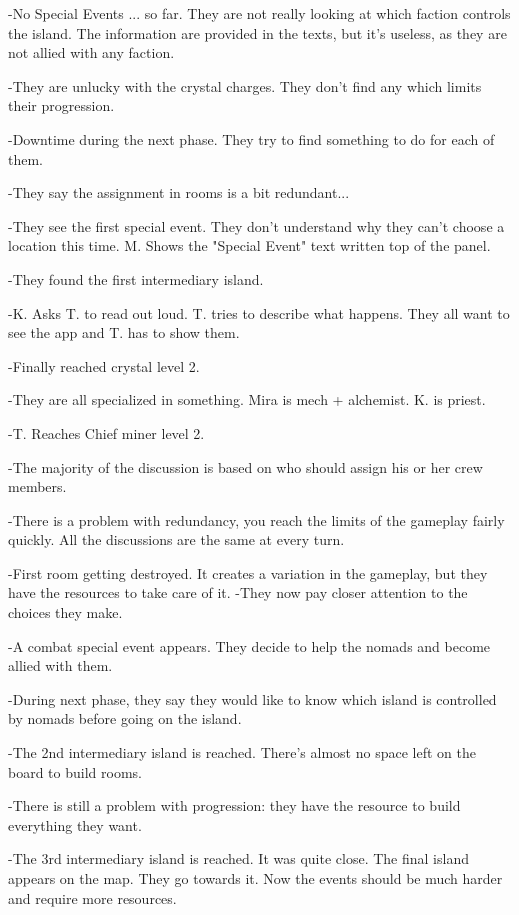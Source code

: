 \documentclass[a4paper,11pt]{report}
\begin{document}
-No Special Events ... so far. They are not really looking at which faction controls the island. The information are provided in the texts, but it's useless, as they are not allied with any faction.

-They are unlucky with the crystal charges. They don't find any which limits their progression.

-Downtime during the next phase. They try to find something to do for each of them.

-They say the assignment in rooms is a bit redundant... 

-They see the first special event. They don't understand why they can't choose a location this time. M. Shows the "Special Event" text written top of the panel.

-They found the first intermediary island. 

-K. Asks T. to read out loud. T. tries to describe what happens. They all want to see the app and T. has to show them.

-Finally reached crystal level 2.

-They are all specialized in something. Mira is mech + alchemist. K. is priest.

-T. Reaches Chief miner level 2.

-The majority of the discussion is based on who should assign his or her crew members.

-There is a problem with redundancy, you reach the limits of the gameplay fairly quickly. All the discussions are the same at every turn.

-First room getting destroyed. It creates a variation in the gameplay, but they have the resources to take care of it.
-They now pay closer attention to the choices they make.

-A combat special event appears. They decide to help the nomads and become allied with them.

-During next phase, they say they would like to know which island is controlled by nomads before going on the island.

-The 2nd intermediary island is reached. There's almost no space left on the board to build rooms. 

-There is still a problem with progression: they have the resource to build everything they want. 

-The 3rd intermediary island is reached. It was quite close. The final island appears on the map. They go towards it. Now the events should be much harder and require more resources.
\end{document}
